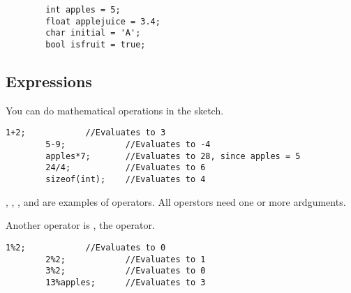 \documentclass{article}
\begin{document}
		\begin{lstlisting}
		int apples = 5;
		float applejuice = 3.4;
		char initial = 'A';
		bool isfruit = true;
		\end{lstlisting}

	\subsection{Expressions}

		You can do mathematical operations in the sketch.

		\begin{lstlisting}[caption={Expressions}, label=expressions]
		1+2;			//Evaluates to 3
		5-9;			//Evaluates to -4
		apples*7;		//Evaluates to 28, since apples = 5
		24/4;			//Evaluates to 6
		sizeof(int);	//Evaluates to 4
		\end{lstlisting}

		\inlncd{+}, \inlncd{-}, \inlncd{*}, \inlncd{/} and  are examples of operators. All operstors need one or more ardguments.

		Another operator is \inlncd{\%}, the  operator.

		\begin{lstlisting}[caption={Expressions}, label=expressions]
		1%2;			//Evaluates to 0
		2%2;			//Evaluates to 1
		3%2;			//Evaluates to 0
		13%apples;		//Evaluates to 3
		\end{lstlisting}
\end{document}
